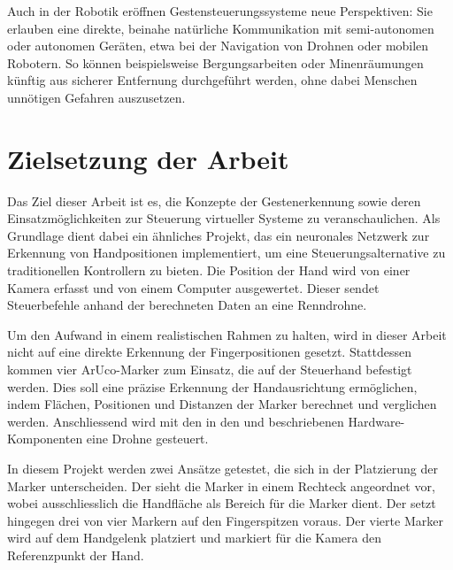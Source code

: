 Auch in der Robotik eröffnen Gestensteuerungssysteme neue Perspektiven: Sie erlauben eine direkte, beinahe natürliche Kommunikation mit semi-autonomen oder autonomen Geräten, etwa bei der Navigation von Drohnen oder mobilen Robotern.
So können beispielsweise Bergungsarbeiten oder Minenräumungen künftig aus sicherer Entfernung durchgeführt werden, ohne dabei Menschen unnötigen Gefahren auszusetzen.

\section{Zielsetzung der Arbeit}
Das Ziel dieser Arbeit ist es, die Konzepte der Gestenerkennung sowie deren Einsatzmöglichkeiten zur Steuerung virtueller Systeme zu veranschaulichen.
Als Grundlage dient dabei ein ähnliches Projekt, das ein neuronales Netzwerk zur Erkennung von Handpositionen implementiert, um eine Steuerungsalternative zu traditionellen Kontrollern zu bieten.
Die Position der Hand wird von einer Kamera erfasst und von einem Computer ausgewertet.
Dieser sendet Steuerbefehle anhand der berechneten Daten an eine Renndrohne.~\cite{arxiv:OmniRace}

Um den Aufwand in einem realistischen Rahmen zu halten, wird in dieser Arbeit nicht auf eine direkte Erkennung der Fingerpositionen gesetzt.
Stattdessen kommen vier ArUco-Marker zum Einsatz, die auf der Steuerhand befestigt werden.
Dies soll eine präzise Erkennung der Handausrichtung ermöglichen, indem Flächen, Positionen und Distanzen der Marker berechnet und verglichen werden.
Anschliessend wird mit den in den  und  beschriebenen Hardware-Komponenten eine Drohne gesteuert.

In diesem Projekt werden zwei Ansätze getestet, die sich in der Platzierung der Marker unterscheiden.
Der  sieht die Marker in einem Rechteck angeordnet vor, wobei ausschliesslich die Handfläche als Bereich für die Marker dient.
Der  setzt hingegen drei von vier Markern auf den Fingerspitzen voraus.
Der vierte Marker wird auf dem Handgelenk platziert und markiert für die Kamera den Referenzpunkt der Hand.

